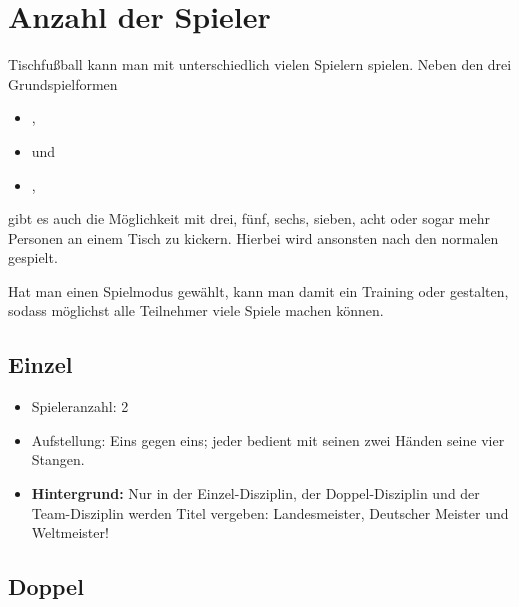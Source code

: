 \section{Anzahl der Spieler}
\label{spielformen:npersonen}

Tischfußball kann man mit unterschiedlich vielen Spielern spielen. 
Neben den drei Grundspielformen 
\begin{itemize}
\item {},
\item {} und 
\item {}, 
\end{itemize}
gibt es auch die Möglichkeit mit drei, fünf, sechs, sieben, acht oder sogar mehr Personen an einem Tisch zu kickern.
Hierbei wird ansonsten nach den normalen  gespielt.

Hat man einen Spielmodus gewählt, kann man damit ein Training oder  gestalten, sodass möglichst alle Teilnehmer viele Spiele machen können. 


\subsection{Einzel}
\label{spielformen:npersonen:einzel}

\begin{itemize}
\item Spieleranzahl: 2
\item Aufstellung: Eins gegen eins; jeder bedient mit seinen zwei Händen seine vier Stangen.
\item {\bf Hintergrund:} Nur in der Einzel-Disziplin, der Doppel-Disziplin und der Team-Disziplin werden Titel vergeben: Landesmeister, Deutscher Meister und Weltmeister!  
\end{itemize}
 
\subsection{Doppel}
\label{spielformen:npersonen:doppel}

